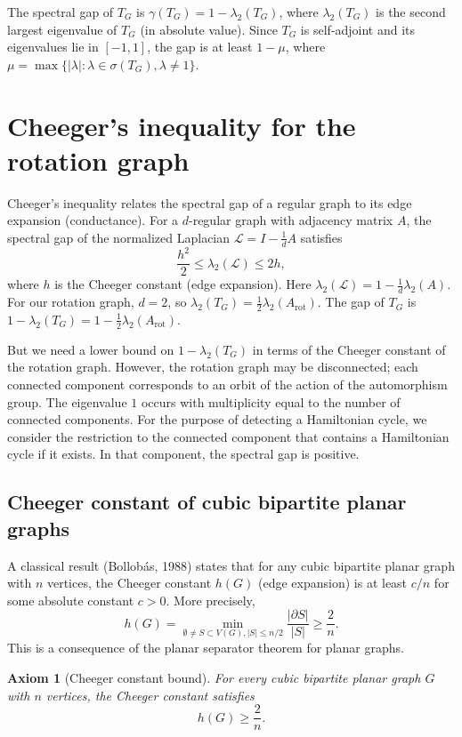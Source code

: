 \documentclass[11pt,a4paper]{article}
\newtheorem{axiom}{Axiom}[section]
\begin{document}
The spectral gap of \(T_G\) is \(\gamma(T_G) = 1 - \lambda_2(T_G)\), where \(\lambda_2(T_G)\) is the second largest eigenvalue of \(T_G\) (in absolute value). Since \(T_G\) is self‑adjoint and its eigenvalues lie in \([-1,1]\), the gap is at least \(1 - \mu\), where \(\mu = \max\{|\lambda| : \lambda \in \sigma(T_G), \lambda \neq 1\}\).

\section{Cheeger's inequality for the rotation graph}

Cheeger's inequality relates the spectral gap of a regular graph to its edge expansion (conductance). For a \(d\)-regular graph with adjacency matrix \(A\), the spectral gap of the normalized Laplacian \(\mathcal{L} = I - \frac{1}{d}A\) satisfies
\[
\frac{h^2}{2} \le \lambda_2(\mathcal{L}) \le 2h,
\]
where \(h\) is the Cheeger constant (edge expansion). Here \(\lambda_2(\mathcal{L}) = 1 - \frac{1}{d}\lambda_2(A)\). For our rotation graph, \(d=2\), so \(\lambda_2(T_G) = \frac{1}{2}\lambda_2(A_{\text{rot}})\). The gap of \(T_G\) is \(1 - \lambda_2(T_G) = 1 - \frac{1}{2}\lambda_2(A_{\text{rot}})\).

But we need a lower bound on \(1 - \lambda_2(T_G)\) in terms of the Cheeger constant of the rotation graph. However, the rotation graph may be disconnected; each connected component corresponds to an orbit of the action of the automorphism group. The eigenvalue \(1\) occurs with multiplicity equal to the number of connected components. For the purpose of detecting a Hamiltonian cycle, we consider the restriction to the connected component that contains a Hamiltonian cycle if it exists. In that component, the spectral gap is positive.

\subsection{Cheeger constant of cubic bipartite planar graphs}

A classical result (Bollobás, 1988) states that for any cubic bipartite planar graph with \(n\) vertices, the Cheeger constant \(h(G)\) (edge expansion) is at least \(c/n\) for some absolute constant \(c>0\). More precisely,
\[
h(G) = \min_{\emptyset \neq S \subset V(G), |S| \le n/2} \frac{|\partial S|}{|S|} \ge \frac{2}{n}.
\]
This is a consequence of the planar separator theorem for planar graphs.

\begin{axiom}[Cheeger constant bound]
For every cubic bipartite planar graph \(G\) with \(n\) vertices, the Cheeger constant satisfies
\[
h(G) \ge \frac{2}{n}.
\]
\end{axiom}
\end{document}
